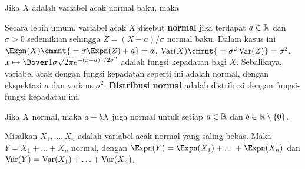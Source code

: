  Jika $X$ adalah variabel acak normal baku, maka




 Secara lebih umum, variabel acak $X$ disebut {\bf
normal} jika terdapat $a\in\Bbb R$ dan $\sigma>0$ sedemikian sehingga
$Z=(X-a)/\sigma$ normal baku. Dalam kasus ini
$\Expn(X)\cmmnt{\mskip5mu =\sigma\Expn(Z)+a}=a$,
$\Var(X)\cmmnt{\mskip5mu =\sigma^2\Var(Z)}=\sigma^2$.
$x\mapsto\Bover1{\sigma\sqrt{2\pi}}e^{-(x-a)^2/2\sigma^2}$
adalah fungsi kepadatan bagi $X$.
Sebaliknya, variabel acak
dengan fungsi kepadatan seperti ini adalah normal,
dengan ekspektasi $a$ dan varians $\sigma^2$.
{\bf Distribusi normal} adalah distribusi dengan fungsi-fungsi kepadatan ini.

 Jika $X$ normal, maka $a+bX$ juga normal untuk setiap
$a\in\Bbb R$ dan $b\in\Bbb R\setminus\{0\}$.

 Misalkan $X_1,\ldots,X_n$ adalah variabel acak
normal yang saling bebas. Maka $Y=X_1+\ldots+X_n$ normal, dengan
$\Expn(Y)=\Expn(X_1)+\ldots+\Expn(X_n)$ dan
$\mathop{\text{Var}}(Y)=\mathop{\text{Var}}(X_1)+\ldots+\mathop{\text{Var}}(X_n)$.

